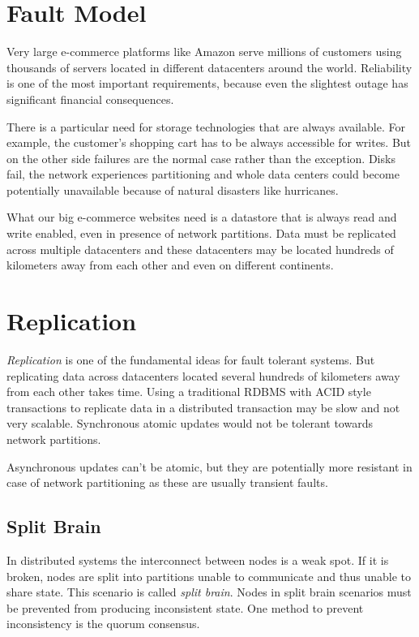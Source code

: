 \section{Fault Model}


Very large e-commerce platforms like Amazon serve
millions of customers using thousands of servers located
in different datacenters around the world. Reliability is one
of the most important requirements, because even the slightest
outage has significant financial consequences. \cite{dynamo} 

There is a particular need for storage technologies that are 
always available. For example, the customer's shopping cart
has to be always accessible for writes. But on the other side failures 
are the normal case rather than the exception. Disks fail,
 the network experiences partitioning and
whole data centers could become potentially unavailable because of
natural disasters like hurricanes.

What our big e-commerce websites need is a datastore that is always
read and write enabled, even in presence of network partitions.
Data must be replicated across multiple datacenters and these
datacenters may be located hundreds of kilometers away from each
other and even on different continents.

\section{Replication}

\emph{Replication} is one of the fundamental ideas for fault
tolerant systems. But replicating data across datacenters located
several hundreds of kilometers away from each other takes time.
Using a traditional RDBMS with ACID style transactions to replicate
data in a distributed transaction may be slow and not very
scalable. Synchronous atomic updates would not be tolerant towards
network partitions.

Asynchronous updates can't be atomic, but they are potentially more
resistant in case of network partitioning as these are usually
transient faults.

\subsection{Split Brain}

In distributed systems the interconnect between nodes is a weak
spot. If it is broken, nodes are split into partitions unable to
communicate and thus unable to share state. This scenario is called
\emph{split brain}. Nodes in split brain scenarios must be
prevented from producing inconsistent state. One method to
prevent inconsistency is the quorum consensus.

